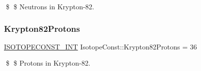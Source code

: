 \$ \$ Neutrons in Krypton-\/82. \mbox{\label{group___isotope_const-_krypton-_kr82_ga3bb6705df38f5f76434e2faa9019d533}} 
\subsubsection{\texorpdfstring{Krypton82\+Protons}{Krypton82Protons}}
{\footnotesize\ttfamily \mbox{\hyperlink{group___isotope_const-_macros_ga5f18360b3e99483a35c32d789e62621c}{I\+S\+O\+T\+O\+P\+E\+C\+O\+N\+S\+T\+\_\+\+I\+NT}} Isotope\+Const\+::\+Krypton82\+Protons = 36}

\$ \$ Protons in Krypton-\/82. 